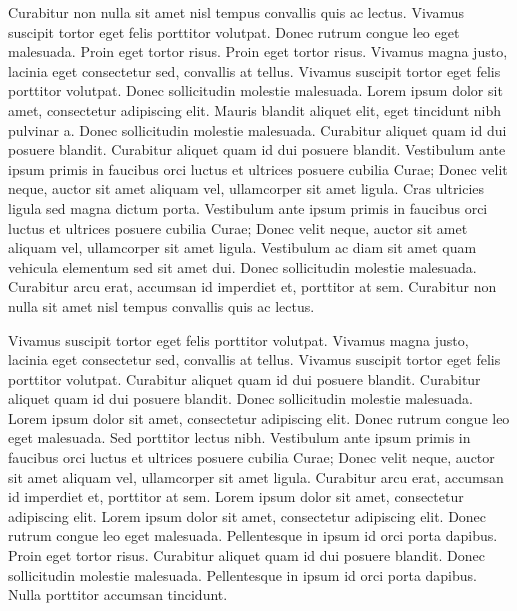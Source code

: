 \documentclass{article}
\begin{document}
Curabitur non nulla sit amet nisl tempus convallis quis ac lectus. Vivamus suscipit tortor eget felis porttitor volutpat. Donec rutrum congue leo eget malesuada. Proin eget tortor risus. Proin eget tortor risus. Vivamus magna justo, lacinia eget consectetur sed, convallis at tellus. Vivamus suscipit tortor eget felis porttitor volutpat. Donec sollicitudin molestie malesuada. Lorem ipsum dolor sit amet, consectetur adipiscing elit. Mauris blandit aliquet elit, eget tincidunt nibh pulvinar a. Donec sollicitudin molestie malesuada. Curabitur aliquet quam id dui posuere blandit. Curabitur aliquet quam id dui posuere blandit. Vestibulum ante ipsum primis in faucibus orci luctus et ultrices posuere cubilia Curae; Donec velit neque, auctor sit amet aliquam vel, ullamcorper sit amet ligula. Cras ultricies ligula sed magna dictum porta. Vestibulum ante ipsum primis in faucibus orci luctus et ultrices posuere cubilia Curae; Donec velit neque, auctor sit amet aliquam vel, ullamcorper sit amet ligula. Vestibulum ac diam sit amet quam vehicula elementum sed sit amet dui. Donec sollicitudin molestie malesuada. Curabitur arcu erat, accumsan id imperdiet et, porttitor at sem. Curabitur non nulla sit amet nisl tempus convallis quis ac lectus.

Vivamus suscipit tortor eget felis porttitor volutpat. Vivamus magna justo, lacinia eget consectetur sed, convallis at tellus. Vivamus suscipit tortor eget felis porttitor volutpat. Curabitur aliquet quam id dui posuere blandit. Curabitur aliquet quam id dui posuere blandit. Donec sollicitudin molestie malesuada. Lorem ipsum dolor sit amet, consectetur adipiscing elit. Donec rutrum congue leo eget malesuada. Sed porttitor lectus nibh. Vestibulum ante ipsum primis in faucibus orci luctus et ultrices posuere cubilia Curae; Donec velit neque, auctor sit amet aliquam vel, ullamcorper sit amet ligula. Curabitur arcu erat, accumsan id imperdiet et, porttitor at sem. Lorem ipsum dolor sit amet, consectetur adipiscing elit. Lorem ipsum dolor sit amet, consectetur adipiscing elit. Donec rutrum congue leo eget malesuada. Pellentesque in ipsum id orci porta dapibus. Proin eget tortor risus. Curabitur aliquet quam id dui posuere blandit. Donec sollicitudin molestie malesuada. Pellentesque in ipsum id orci porta dapibus. Nulla porttitor accumsan tincidunt.
\end{document}
